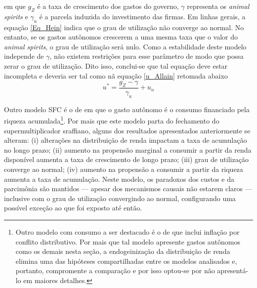 em que $g_Z$ é a taxa de crescimento dos gastos do governo, $\gamma$ representa os \textit{animal spirits} e $\gamma_u$ é a parcela induzida do investimento das firmas.
Em linhas gerais, a equação \ref{Eq_Hein} indica que o grau de utilização não converge ao normal.
No entanto, se os gastos autônomos crescerem a uma mesma taxa que o valor do \textit{animal spirits}, o grau de utilização será nulo.
Como a estabilidade deste modelo independe de $\gamma$, não existem restrições para esse parâmetro de modo que possa zerar o grau de utilização. Dito isso, conclui-se que tal equação deve estar incompleta e deveria ser tal como nã equação \ref{u_Allain} retomada abaixo
$$
u^* = \frac{g_Z - \gamma}{\gamma_u} + u_n
$$

Outro modelo SFC é o de \textcite{brochier_supermultiplier_2018} em que o gasto autônomo é o consumo financiado pela riqueza acumulada\footnote{
	Outro modelo com consumo a ser destacado é o de \textcite{nah_role_2019} %
	que inclui inflação por conflito distributivo. Por mais que tal modelo apresente gastos autônomos como os demais nesta seção, a endogeinização da distribuição de renda elimina uma das hipóteses compartilhadas entre os modelos analisados e, portanto, compromente a comparação e por isso optou-se por não apresentá-lo em maiores detalhes.
}. 
Por mais que este modelo parta do fechamento do supermultiplicador sraffiano,
alguns dos resultados apresentados anteriormente se alteram: 
	(i) alterações na distribuição de renda impactam a taxa de acumulação no longo prazo; 
	(ii) aumento na propensão marginal a consumir a partir da renda disponível aumenta a taxa de crescimento de longo prazo; 
	(iii) grau de utilização converge ao normal; 
	(iv) aumento na propensão a consumir a partir da riqueza aumenta a taxa de acumulação. 
	Neste modelo, os paradoxos dos custos e da parcimônia são mantidos --- apesar dos mecanismos causais não estarem claros --- inclusive com o grau de utilização convergindo ao normal, configurando uma possível exceção ao que foi exposto até então.




